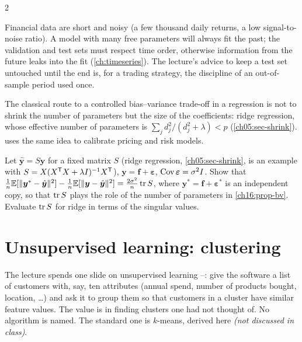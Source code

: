 \begin{paracol}{2}
\begin{finance}
Financial data are short and noisy (a few thousand daily returns, a low signal-to-noise ratio). A model with many free
parameters will always fit the past; the validation and test sets must respect time order, otherwise
information from the future leaks into the fit (\cref{ch:timeseries}). The lecture's advice to keep a test set
untouched until the end is, for a trading strategy, the discipline of an out-of-sample period used once.
\end{finance}
\begin{remark}
The classical route to a controlled bias--variance trade-off in a regression is not to shrink the number of parameters but the
size of the coefficients: ridge regression, whose effective number of parameters is $\sum_jd_j^2/(d_j^2+\lambda)<p$
(\cref{ch05:sec-shrink}).  uses the same idea to calibrate pricing and risk models.
\end{remark}

\begin{exercise}
Let $\hat{\bm y}=S\bm y$ for a fixed matrix $S$ (ridge regression, \cref{ch05:sec-shrink}, is an example with $S=X(X^{\mathsf T} X+\lambda I)^{-1}X^{\mathsf T}$), $\bm y=\bm f+\bm\varepsilon$, $\operatorname{Cov}\bm\varepsilon=\sigma^2I$. Show that $\frac1n\mathbb{E}[\|\bm y^*-\hat{\bm y}\|^2]-\frac1n\mathbb{E}[\|\bm y-\hat{\bm y}\|^2]=\frac{2\sigma^2}{n}\operatorname{tr} S$, where
$\bm y^*=\bm f+\bm\varepsilon^*$ is an independent copy, so that $\operatorname{tr} S$ plays the role of the number of parameters in \cref{ch16:prop-bv}. Evaluate $\operatorname{tr} S$ for ridge in terms of the singular values.
\end{exercise}

\section{Unsupervised learning: clustering}\label{ch16:sec-unsup}
The lecture spends one slide on unsupervised learning --: give the software a list of
customers with, say, ten attributes (annual spend, number of products bought, location, \dots) and ask it to group them so that
customers in a cluster have similar feature values. The value is in finding clusters one had not thought of.
No algorithm is named. The standard one is $k$-means, derived here \emph{(not discussed in class)}.


\end{paracol}
